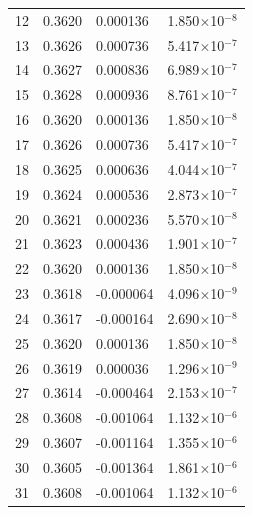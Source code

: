 \begin{longtable}{|c|p{3.2cm}|p{3.5cm}|p{3.5cm}|}
12 & 0.3620 & 0.000136 & 1.850$\times$10$^{-8}$ \\

13 & 0.3626 & 0.000736 & 5.417$\times$10$^{-7}$ \\

14 & 0.3627 & 0.000836 & 6.989$\times$10$^{-7}$ \\

15 & 0.3628 & 0.000936 & 8.761$\times$10$^{-7}$ \\

16 & 0.3620 & 0.000136 & 1.850$\times$10$^{-8}$ \\

17 & 0.3626 & 0.000736 & 5.417$\times$10$^{-7}$ \\

18 & 0.3625 & 0.000636 & 4.044$\times$10$^{-7}$ \\

19 & 0.3624 & 0.000536 & 2.873$\times$10$^{-7}$ \\

20 & 0.3621 & 0.000236 & 5.570$\times$10$^{-8}$ \\

21 & 0.3623 & 0.000436 & 1.901$\times$10$^{-7}$ \\

22 & 0.3620 & 0.000136 & 1.850$\times$10$^{-8}$ \\

23 & 0.3618 & -0.000064 & 4.096$\times$10$^{-9}$ \\

24 & 0.3617 & -0.000164 & 2.690$\times$10$^{-8}$ \\

25 & 0.3620 & 0.000136 & 1.850$\times$10$^{-8}$ \\

26 & 0.3619 & 0.000036 & 1.296$\times$10$^{-9}$ \\

27 & 0.3614 & -0.000464 & 2.153$\times$10$^{-7}$ \\

28 & 0.3608 & -0.001064 & 1.132$\times$10$^{-6}$ \\

29 & 0.3607 & -0.001164 & 1.355$\times$10$^{-6}$ \\

30 & 0.3605 & -0.001364 & 1.861$\times$10$^{-6}$ \\

31 & 0.3608 & -0.001064 & 1.132$\times$10$^{-6}$ \\


\end{longtable}
